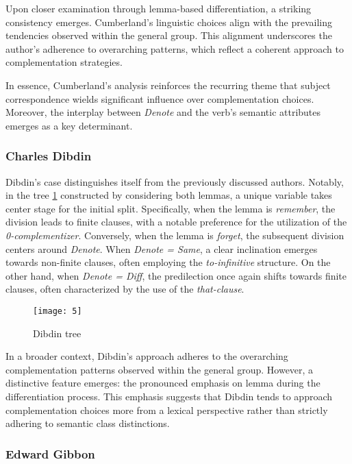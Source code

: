 \documentclass[final]{clv3} %
\begin{document}
Upon closer examination through lemma-based differentiation, a striking consistency emerges. Cumberland's linguistic choices align with the prevailing tendencies observed within the general group. This alignment underscores the author's adherence to overarching patterns, which reflect a coherent approach to complementation strategies.

In essence, Cumberland's analysis reinforces the recurring theme that subject correspondence wields significant influence over complementation choices. Moreover, the interplay between \textit{Denote} and the verb's semantic attributes emerges as a key determinant.

\subsubsection{Charles Dibdin}

Dibdin's case distinguishes itself from the previously discussed authors. Notably, in the tree \cref{fig:7}  constructed by considering both lemmas, a unique variable takes center stage for the initial split. Specifically, when the lemma is \textit{remember}, the division leads to finite clauses, with a notable preference for the utilization of the \textit{\textit{0-complementizer}}. Conversely, when the lemma is \textit{forget}, the subsequent division centers around \textit{\textit{Denote}}. When\textit{ \textit{Denote} = Same}, a clear inclination emerges towards non-finite clauses, often employing the \textit{\textit{to-infinitive}} structure. On the other hand, when \textit{\textit{Denote} = Diff}, the predilection once again shifts towards finite clauses, often characterized by the use of the \textit{that-clause}.

\begin{figure}[htpb]
    \centering
    \texttt{[image: 5]}
    \caption{Dibdin tree}
    \label{fig:7}
\end{figure}

In a broader context, Dibdin's approach adheres to the overarching complementation patterns observed within the general group. However, a distinctive feature emerges: the pronounced emphasis on lemma during the differentiation process. This emphasis suggests that Dibdin tends to approach complementation choices more from a lexical perspective rather than strictly adhering to semantic class distinctions.

\subsubsection{Edward Gibbon}
\end{document}
